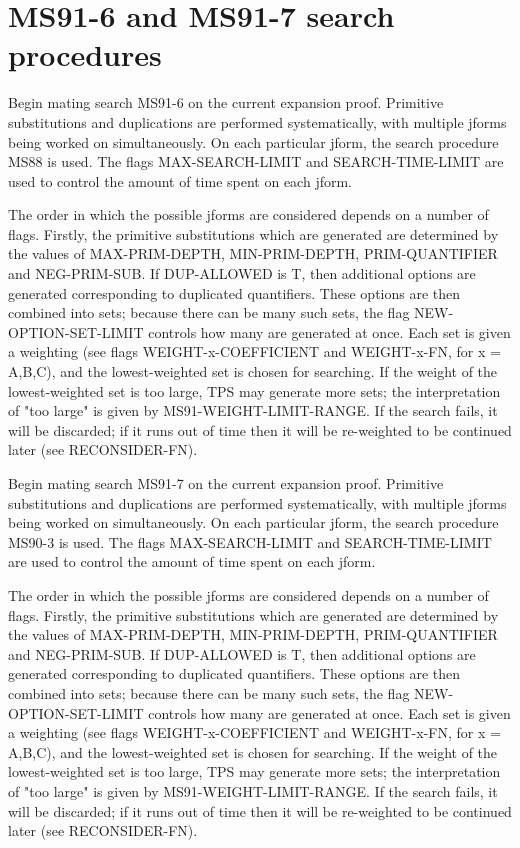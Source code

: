 \section{MS91-6 and MS91-7 search procedures}

\begin{description} 
\item[MS91-6]  
Begin mating search MS91-6 on the current expansion proof.
Primitive substitutions and duplications are performed systematically,
with multiple jforms being worked on simultaneously.  On each
particular jform, the search procedure MS88 is used.  The flags
MAX-SEARCH-LIMIT and SEARCH-TIME-LIMIT are used to control the amount
of time spent on each jform.

The order in which the possible jforms are considered depends on a 
number of flags. Firstly, the primitive substitutions which are generated 
are determined by the values of MAX-PRIM-DEPTH, MIN-PRIM-DEPTH,
PRIM-QUANTIFIER and NEG-PRIM-SUB. If DUP-ALLOWED is T, then additional
options are generated corresponding to duplicated quantifiers. These
options are then combined into sets; because there can be many such sets,
the flag NEW-OPTION-SET-LIMIT controls how many are generated at once.
Each set is given a weighting (see flags WEIGHT-x-COEFFICIENT and 
WEIGHT-x-FN, for x = A,B,C), and the lowest-weighted set is chosen
for searching. If the weight of the lowest-weighted set is too large,
TPS may generate more sets; the interpretation of "too large" is given
by MS91-WEIGHT-LIMIT-RANGE. If the search fails, it will be discarded;
if it runs out of time then it will be re-weighted to be continued
later (see RECONSIDER-FN).

\item[MS91-7]  
Begin mating search MS91-7 on the current expansion proof.
Primitive substitutions and duplications are performed systematically,
with multiple jforms being worked on simultaneously.  On each
particular jform, the search procedure MS90-3 is used.  The flags
MAX-SEARCH-LIMIT and SEARCH-TIME-LIMIT are used to control the amount
of time spent on each jform.

The order in which the possible jforms are considered depends on a 
number of flags. Firstly, the primitive substitutions which are generated 
are determined by the values of MAX-PRIM-DEPTH, MIN-PRIM-DEPTH,
PRIM-QUANTIFIER and NEG-PRIM-SUB. If DUP-ALLOWED is T, then additional
options are generated corresponding to duplicated quantifiers. These
options are then combined into sets; because there can be many such sets,
the flag NEW-OPTION-SET-LIMIT controls how many are generated at once.
Each set is given a weighting (see flags WEIGHT-x-COEFFICIENT and 
WEIGHT-x-FN, for x = A,B,C), and the lowest-weighted set is chosen
for searching. If the weight of the lowest-weighted set is too large,
TPS may generate more sets; the interpretation of "too large" is given
by MS91-WEIGHT-LIMIT-RANGE. If the search fails, it will be discarded;
if it runs out of time then it will be re-weighted to be continued
later (see RECONSIDER-FN).
\item
\end{description}

